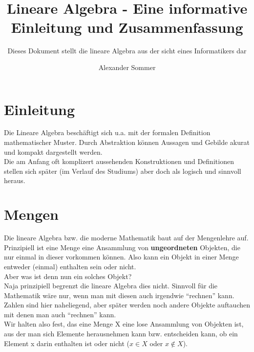 \documentclass[parskip=full]{scrartcl}
\title{Lineare Algebra - Eine informative Einleitung und Zusammenfassung}
\subtitle{Dieses Dokument stellt die lineare Algebra aus der sicht eines Informatikers dar}
\author{Alexander Sommer}
\begin{document}
\maketitle

\section{Einleitung}
    Die Lineare Algebra beschäftigt sich u.a. mit der formalen Definition mathematischer Muster.
    Durch Abstraktion können Aussagen und Gebilde akurat und kompakt dargestellt werden.
    \\Die am Anfang oft komplizert aussehenden Konstruktionen und Definitionen stellen sich später
    (im Verlauf des Studiums) aber doch als logisch und sinnvoll heraus.

\section{Mengen}
    Die lineare Algebra bzw. die moderne Mathematik baut auf der Mengenlehre auf.
    Prinzipiell ist eine Menge eine Ansammlung von \textbf{ungeordneten} Objekten, die nur einmal in dieser vorkommen können.
    Also kann ein Objekt in einer Menge entweder (einmal) enthalten sein oder nicht.
    \\Aber was ist denn nun ein solches Objekt?
    \\Naja prinzipiell begrenzt die lineare Algebra dies nicht.
    Sinnvoll für die Mathematik wäre nur, wenn man mit diesen auch irgendwie \enquote{rechnen} kann. 
    Zahlen sind hier naheliegend, aber später werden noch andere Objekte auftauchen mit denen man auch \enquote{rechnen} kann.
    \\Wir halten also fest, das eine Menge X eine lose Ansammlung von Objekten ist, 
    aus der man sich Elemente herausnehmen kann bzw. entscheiden kann, ob ein Element x darin enthalten ist oder nicht (\(x \in X\) oder \(x\notin X\)).
    
\end{document}
